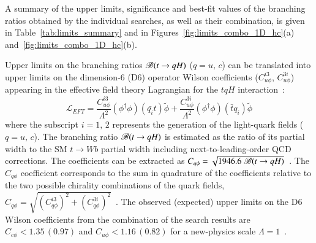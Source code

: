 A summary of the upper limits, significance and best-fit values of the branching ratios obtained by the individual searches, as well as their combination, is given  
in Table~\ref{tab:limits_summary} and in Figures~\ref{fig:limits_combo_1D_hc}(a) and~\ref{fig:limits_combo_1D_hc}(b).

Upper limits on the branching ratios $\mathscr{B}(t\rightarrow qH)$ ($q=u,\, c$) can be translated into upper limits on the dimension-6 (D6) operator Wilson coefficients ($C^{i3}_{u\phi}$,
$C^{3i}_{u\phi}$) appearing in the effective field theory Lagrangian for the $tqH$ interaction~\cite{fcnc_production_theory}:
%
\begin{equation*}
  \mathcal{L}_{EFT} = \frac{C^{i3}_{u\phi}}{\Lambda^{2}}(\phi^{\dagger}\phi)(\bar{q_{i}}t)\tilde{\phi} + \frac{C^{3i}_{u\phi}}{\Lambda^{2}}(\phi^{\dagger}\phi)(\bar{t}q_{i})\tilde{\phi}
  \label{eq:eq01}
\end{equation*}
%
where the subscript $i=1,\, 2$ represents the generation of the light-quark fields ($q=u,\, c$).
The branching ratio $\mathscr{B}(t\rightarrow qH)$ is estimated as the ratio of its partial width to the SM $t \to Wb$ partial width including next-to-leading-order QCD corrections. The coefficients can be extracted as $C_{q\phi} = \sqrt{1946.6~\mathscr{B}(t\rightarrow qH)}$~\cite{fcnc_production_theory}. The $C_{q\phi}$ coefficient corresponds to the sum in quadrature of the coefficients relative to the two possible chirality combinations of the quark fields,
$C_{q\phi} =\sqrt{(C^{i3}_{q\phi})^2 + (C^{3i}_{q\phi})^2}$~\cite{fcnc_production_theory}. The observed (expected) upper limits on the D6 Wilson coefficients from the combination of the search
results are $C_{c\phi}<1.35\,(0.97)$ and $C_{u\phi}<1.16\,(0.82)$ for a new-physics scale $\Lambda=1$~\TeV. 

